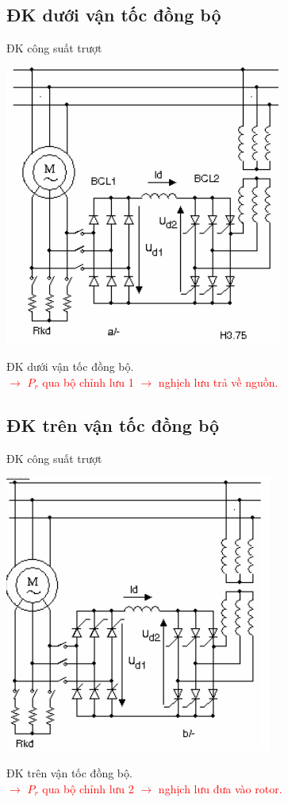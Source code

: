 \documentclass[14pt]{beamer}
\newcommand{\giaithich}[1]{\textcolor{red}{$\longrightarrow$ #1}}
\begin{document}
\subsection*{ĐK dưới vận tốc đồng bộ}
\begin{frame}{ĐK công suất trượt}
		\begin{center}
			\includegraphics[scale=.4]{images-chude3/cascade-2.png} 
		\end{center}
		ĐK dưới vận tốc đồng bộ.\\
		\giaithich{$P_r$ qua bộ chỉnh lưu 1 $\longrightarrow$ nghịch lưu trả về nguồn.}
\end{frame}

\subsection*{ĐK trên vận tốc đồng bộ}
\begin{frame}{ĐK công suất trượt}
		\begin{center}
			\includegraphics[scale=.4]{images-chude3/cascade.png} 
		\end{center}
		ĐK trên vận tốc đồng bộ.\\
		\giaithich{$P_r$ qua bộ chỉnh lưu 2 $\longrightarrow$ nghịch lưu đưa vào rotor.}
\end{frame}
\end{document}
